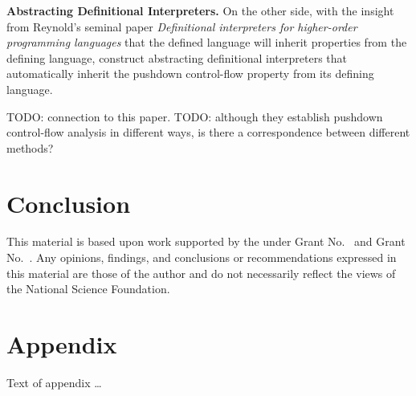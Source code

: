 \documentclass[acmsmall,review,anonymous]{acmart}\settopmatter{printfolios=true,printccs=false,printacmref=false}
\begin{document}
\textbf{Abstracting Definitional Interpreters.}
On the other side, with the insight from Reynold's seminal paper 
\emph{Definitional interpreters for higher-order programming languages} \cite{reynolds1972definitional}
that the defined language will inherit properties
from the defining language, \citeauthor{darais2017abstracting} construct abstracting 
definitional interpreters that automatically inherit the pushdown control-flow 
property from its defining language.

TODO: connection to this paper.
TODO: although they establish pushdown control-flow analysis in different ways, 
is there a correspondence between different methods?

\section{Conclusion}

\begin{acks}                            %
  This material is based upon work supported by the
   under Grant
  No.~ and Grant
  No.~.  Any opinions, findings, and
  conclusions or recommendations expressed in this material are those
  of the author and do not necessarily reflect the views of the
  National Science Foundation.
\end{acks}



\appendix
\section{Appendix}

Text of appendix \ldots
\end{document}
